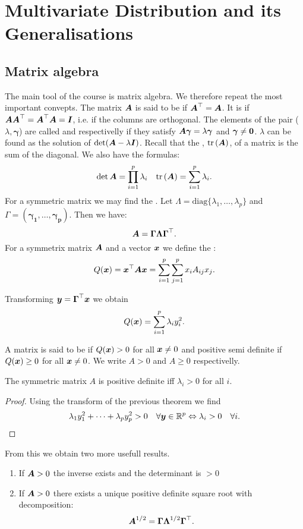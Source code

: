 \section{Multivariate Distribution and its Generalisations}
\subsection{Matrix algebra}

The main tool of the course is matrix algebra. We therefore repeat the most important convepts. The matrix $\boldsymbol{A}$ is said to be  if $\boldsymbol{A}^\top=\boldsymbol{A}$. It is  if $\boldsymbol{A}\boldsymbol{A}^\top=\boldsymbol{A}^\top\boldsymbol{A}=\boldsymbol{I}$, i.e. if the columns are orthogonal. The elements of the pair ($\lambda, \boldsymbol{\gamma}$) are called  and  respectivelly if they satisfy $\boldsymbol{A}\boldsymbol{\gamma}=\lambda \boldsymbol{\gamma}$ and $\boldsymbol{\gamma}\ne \boldsymbol{0}$. $\lambda$ can be found as the solution of $\det(\boldsymbol{A}-\lambda \boldsymbol{I})$. Recall that the , $\mathrm{tr}\left(\boldsymbol{A}\right)$, of a matrix is the sum of the diagonal. We also have the formulas:
$$
    \det{\boldsymbol{A}} = \prod_{i=1}^p \lambda_i
    \quad
    \mathrm{tr}\left(\boldsymbol{A}\right) = \sum_{i=1}^p \lambda_i.
$$
For a symmetric matrix we may find the . Let $\Lambda = \textrm{diag}\{\lambda_1, \dots, \lambda_p\}$ and $\Gamma = (\boldsymbol{\gamma_1}, \dots, \boldsymbol{\gamma_p})$. Then we have:
$$
    \boldsymbol{A}=\boldsymbol{\Gamma}\boldsymbol{\Lambda}\boldsymbol{\Gamma}^\top.
$$
For a symmetrix matrix $\boldsymbol{A}$ and a vector $\boldsymbol{x}$ we define the :
$$
    Q(\boldsymbol{x}) = \boldsymbol{x}^\top \boldsymbol{A} \boldsymbol{x} = \sum_{i=1}^p\sum_{j=1}^p x_i A_{ij} x_j.
$$
\begin{theorem}
    Transforming $\boldsymbol{y}=\boldsymbol{\Gamma}^\top\boldsymbol{x}$ we obtain 
    $$
        Q(\boldsymbol{x}) = \sum_{i=1}^p \lambda_i y_i^2.
    $$
\end{theorem}
A matrix is said to be  if $Q(\boldsymbol{x})>0$ for all $\boldsymbol{x}\ne0$ and positive semi definite if $Q(\boldsymbol{x})\geq0$ for all $\boldsymbol{x}\ne0$. We write $A>0$ and $A\geq 0$ respectivelly. 
\begin{theorem}
    The symmetric matrix $A$ is positive definite iff $\lambda_i > 0$ for all $i$.
\end{theorem}
\begin{proof}
    Using the transform of the previous theorem we find 
    $$
        \lambda_1 y_1^2 + \dots + \lambda_p y_p^2 > 0 \quad\forall \boldsymbol{y}\in\mathbb{R}^p \Leftrightarrow \lambda_i > 0 \quad\forall i. 
    $$
\end{proof}
From this we obtain two more usefull results. 
\begin{enumerate}
    \item If $\boldsymbol{A}>0$ the inverse exists and the determinant is $>0$
    \item If $\boldsymbol{A}>0$ there exists a unique positive definite square root with decomposition:
    $$
        \boldsymbol{A}^{1/2} = \boldsymbol{\Gamma}\boldsymbol{\Lambda}^{1/2}\boldsymbol{\Gamma}^\top.
    $$
\end{enumerate}


